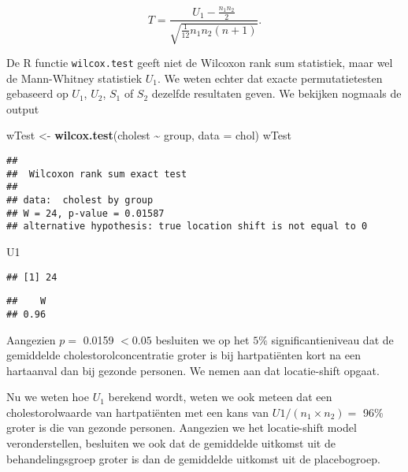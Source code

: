 \documentclass[
  12pt,dutch,coursenotes]{book}
\newenvironment{Shaded}{\begin{snugshade}}{\end{snugshade}}
\newcommand{\DataTypeTok}[1]{\textcolor[rgb]{0.13,0.29,0.53}{#1}}
\newcommand{\KeywordTok}[1]{\textcolor[rgb]{0.13,0.29,0.53}{\textbf{#1}}}
\newcommand{\NormalTok}[1]{#1}
\newcommand{\OperatorTok}[1]{\textcolor[rgb]{0.81,0.36,0.00}{\textbf{#1}}}
\newcommand{\StringTok}[1]{\textcolor[rgb]{0.31,0.60,0.02}{#1}}
\theoremstyle{definition}
\theoremstyle{definition}
\theoremstyle{definition}
\theoremstyle{remark}
\begin{document}
\[
  T = \frac{U_1 - \frac{n_1n_2}{2}}{\sqrt{\frac{1}{12}n_1n_2(n+1)}}.
\]

De R functie \texttt{wilcox.test} geeft niet de Wilcoxon rank sum statistiek, maar wel de Mann-Whitney statistiek \(U_1\).
We weten echter dat exacte permutatietesten gebaseerd op \(U_1\), \(U_2\), \(S_1\) of \(S_2\) dezelfde resultaten geven.
We bekijken nogmaals de output

\begin{Shaded}
\begin{Highlighting}[]
\NormalTok{wTest \textless{}{-}}\StringTok{ }\KeywordTok{wilcox.test}\NormalTok{(cholest }\OperatorTok{\textasciitilde{}}\StringTok{ }\NormalTok{group, }\DataTypeTok{data =}\NormalTok{ chol)}
\NormalTok{wTest}
\end{Highlighting}
\end{Shaded}

\begin{verbatim}
## 
##  Wilcoxon rank sum exact test
## 
## data:  cholest by group
## W = 24, p-value = 0.01587
## alternative hypothesis: true location shift is not equal to 0
\end{verbatim}

\begin{Shaded}
\begin{Highlighting}[]
\NormalTok{U1}
\end{Highlighting}
\end{Shaded}

\begin{verbatim}
## [1] 24
\end{verbatim}

\begin{Shaded}
\end{Shaded}

\begin{verbatim}
##    W 
## 0.96
\end{verbatim}

Aangezien \(p=\) 0.0159 \(<0.05\) besluiten we op het \(5\%\) significantieniveau dat de gemiddelde cholestorolconcentratie groter is bij hartpatiënten kort na een hartaanval dan bij gezonde personen. We nemen aan dat locatie-shift opgaat.

Nu we weten hoe \(U_1\) berekend wordt, weten we ook meteen dat een cholestorolwaarde van hartpatiënten met een kans van
\(U1/(n_1\times n_2)=\) 96\%
groter is die van gezonde personen. Aangezien we het locatie-shift model veronderstellen, besluiten we ook dat de gemiddelde uitkomst uit de behandelingsgroep groter is dan de gemiddelde uitkomst uit de placebogroep.
\end{document}
